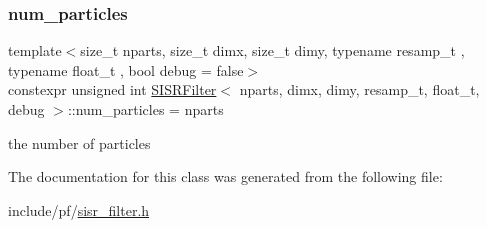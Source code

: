 \subsubsection{\texorpdfstring{num\+\_\+particles}{num\_particles}}
{\footnotesize\ttfamily template$<$size\+\_\+t nparts, size\+\_\+t dimx, size\+\_\+t dimy, typename resamp\+\_\+t , typename float\+\_\+t , bool debug = false$>$ \\
constexpr unsigned int \hyperlink{classSISRFilter}{S\+I\+S\+R\+Filter}$<$ nparts, dimx, dimy, resamp\+\_\+t, float\+\_\+t, debug $>$\+::num\+\_\+particles = nparts\hspace{0.3cm}{\ttfamily [static]}}

the number of particles 

The documentation for this class was generated from the following file\+:\begin{DoxyCompactItemize}
\item 
include/pf/\hyperlink{sisr__filter_8h}{sisr\+\_\+filter.\+h}\end{DoxyCompactItemize}
